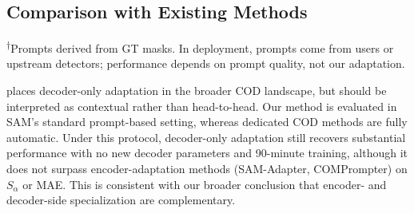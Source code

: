 \subsection{Comparison with Existing Methods}

\begin{table}[t]
\centering
\caption{\textbf{Comparison with COD methods} on COD10K test set. This table contextualizes decoder-only adaptation within the broader COD landscape. \emph{Important:} our method uses oracle GT-derived prompts, while dedicated methods are fully automatic---these are not head-to-head comparisons.\textsuperscript{$\dagger$}}
\label{tab:comparison}
\small
{}
\vspace{1pt}
{\footnotesize \textsuperscript{$\dagger$}Prompts derived from GT masks. In deployment, prompts come from users or upstream detectors; performance depends on prompt quality, not our adaptation.}
\end{table}

 places decoder-only adaptation in the broader COD landscape, but should be interpreted as contextual rather than head-to-head. Our method is evaluated in SAM's standard prompt-based setting, whereas dedicated COD methods are fully automatic. Under this protocol, decoder-only adaptation still recovers substantial performance with no new decoder parameters and 90-minute training, although it does not surpass encoder-adaptation methods (SAM-Adapter, COMPrompter) on $S_\alpha$ or MAE. This is consistent with our broader conclusion that encoder- and decoder-side specialization are complementary.

